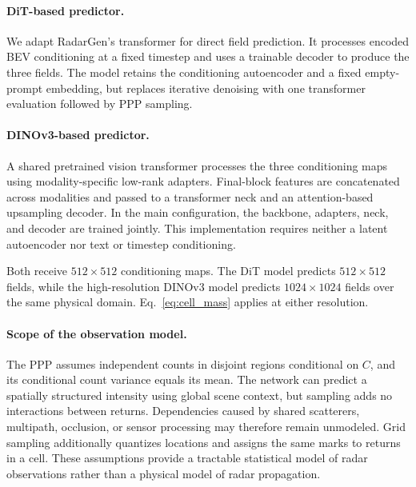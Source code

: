 \paragraph{DiT-based predictor.}
We adapt RadarGen's transformer for direct field prediction.
It processes encoded BEV conditioning at a fixed timestep and uses a trainable decoder to produce the three fields.
The model retains the conditioning autoencoder and a fixed empty-prompt embedding, but replaces iterative denoising with one transformer evaluation followed by PPP sampling.

\paragraph{DINOv3-based predictor.}
A shared pretrained vision transformer processes the three conditioning maps using modality-specific low-rank adapters.
Final-block features are concatenated across modalities and passed to a transformer neck and an attention-based upsampling decoder.
In the main configuration, the backbone, adapters, neck, and decoder are trained jointly.
This implementation requires neither a latent autoencoder nor text or timestep conditioning.

Both receive $512\times512$ conditioning maps.
The DiT model predicts $512\times512$ fields, while the high-resolution DINOv3 model predicts $1024\times1024$ fields over the same physical domain.
Eq.~\eqref{eq:cell_mass} applies at either resolution.

\paragraph{Scope of the observation model.}
The PPP assumes independent counts in disjoint regions conditional on $C$, and its conditional count variance equals its mean.
The network can predict a spatially structured intensity using global scene context, but sampling adds no interactions between returns.
Dependencies caused by shared scatterers, multipath, occlusion, or sensor processing may therefore remain unmodeled.
Grid sampling additionally quantizes locations and assigns the same marks to returns in a cell.
These assumptions provide a tractable statistical model of radar observations rather than a physical model of radar propagation.
